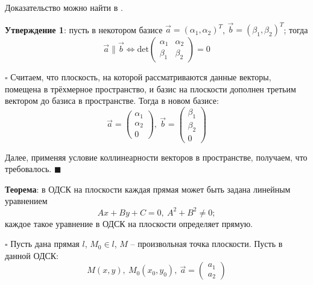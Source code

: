 \documentclass[12pt, a4paper, reqno]{article}
\begin{document}
    Доказательство можно найти в \cite{beklemishev}.

    \textbf{Утверждение 1}: пусть в некотором базисе $\vec{a} = (\alpha_1, \alpha_2)^T$,
    $\vec{b} = (\beta_1, \beta_2)^T$; тогда
    \begin{equation*}
        \vec{a} \parallel \vec{b} \iff \text{det}
        \begin{pmatrix}
            \alpha_1 & \alpha_2 \\
            \beta_1  & \beta_2
        \end{pmatrix} = 0
    \end{equation*}

    $\square$
    Считаем, что плоскость, на которой рассматриваются данные векторы, помещена в трёхмерное
    пространство, и базис на плоскости дополнен третьим вектором до базиса в пространстве. Тогда
    в новом базисе:
    \begin{equation*}
        \vec{a} =
        \begin{pmatrix}
            \alpha_1 \\ \alpha_2 \\ 0
        \end{pmatrix},\
        \vec{b} =
        \begin{pmatrix}
            \beta_1 \\ \beta_2 \\ 0
        \end{pmatrix}
    \end{equation*}

    Далее, применяя условие коллинеарности векторов в пространстве, получаем, что требовалось.
    $\blacksquare$

    \textbf{Теорема}: в ОДСК на плоскости каждая прямая  может быть задана линейным уравнением
    \begin{equation}\label{planar-line-equation}
        \boxed{Ax + By + C = 0,\ A^2 + B^2 \neq 0};
    \end{equation}
    каждое такое уравнение в ОДСК на плоскости определяет прямую.

    $\square$
    Пусть дана прямая $l$, $M_0 \in l$, $M$ -- произвольная точка плоскости. Пусть в данной ОДСК:
    \begin{equation*}
        M(x, y),\ M_0(x_0, y_0),\ \vec{a} =
        \begin{pmatrix}
            a_1 \\ a_2
        \end{pmatrix}
    \end{equation*}
\end{document}
